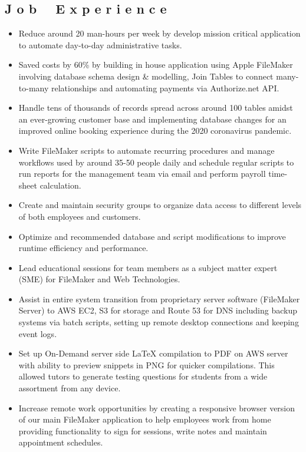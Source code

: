 \documentclass{resume}
\begin{document}
\subsection{J o b \ \ E x p e r i e n c e}

\begin{itemize}
\item \small \raggedright Reduce around 20 man-hours per week by develop mission critical application to automate day-to-day administrative tasks.
\item \small \raggedright Saved costs by 60\% by building in house application using Apple FileMaker involving database schema design \& modelling, Join Tables to connect many-to-many relationships and automating payments via Authorize.net API.
\item \small \raggedright Handle tens of thousands of records spread across around 100 tables amidst an ever-growing customer base and implementing database changes for an improved online booking experience during the 2020 coronavirus pandemic.
\item \small \raggedright Write FileMaker scripts to automate recurring procedures and manage workflows used by around 35-50 people daily and schedule regular scripts to run reports for the management team via email and perform payroll time-sheet calculation.
\item \small \raggedright Create and maintain security groups to organize data access to different levels of both employees and customers.
\item \small \raggedright Optimize and recommended database and script modifications to improve runtime efficiency and performance.
\item \small \raggedright Lead educational sessions for team members as a subject matter expert (SME) for FileMaker and Web Technologies.
\item \small \raggedright Assist in entire system transition from proprietary server software (FileMaker Server) to AWS EC2, S3 for storage and Route 53 for DNS including backup systems via batch scripts, setting up remote desktop connections and keeping event logs.
\item \small \raggedright Set up On-Demand server side LaTeX compilation to PDF on AWS server with ability to preview snippets in PNG for quicker compilations. This allowed tutors to generate testing questions for students from a wide assortment from any device.
\item \small \raggedright Increase remote work opportunities by creating a responsive browser version of our main FileMaker application to help employees work from home providing functionality to sign for sessions, write notes and maintain appointment schedules.


\end{itemize}
\end{document}
